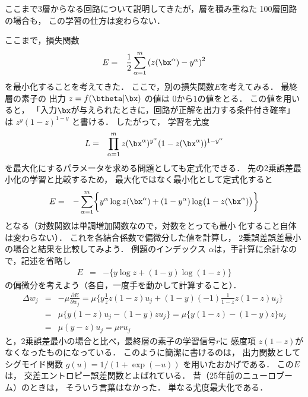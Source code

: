 \documentclass[a4paper,11pt]{jarticle}
\begin{document}
ここまで3層からなる回路について説明してきたが，層を積み重ねた
100層回路の場合も，
この学習の仕方は変わらない．


ここまで，損失関数
\begin{eqnarray}
E & = & \frac{1}{2} 
\sum_{\alpha=1}^{m} 
\left ( z(\bx^\alpha) - y^\alpha \right )^2
\end{eqnarray}
を最小化することを考えてきた．
ここで，別の損失関数$E$を考えてみる．
最終層の素子の
出力 $ z = f(\btheta | \bx)$ の値は
$0$から$1$の値をとる．
この値を用いると，
「入力$\bx$が与えられたときに，回路が正解を出力する条件付き確率」
は
$ z^y (1-z)^{1-y}$
 と書ける．
 したがって，
 学習を尤度
\begin{eqnarray}
 L & = &
\prod_{\alpha=1}^{m} 
z(\bx^\alpha)^{y^\alpha} (1-z(\bx^\alpha))^{1-{y^{\alpha}}}
\end{eqnarray}
を最大化にするパラメータを求める問題としても定式化できる．
先の2乗誤差最小化の学習と比較するため，
最大化ではなく最小化として定式化すると
\begin{eqnarray}
 E & = &
- \sum_{\alpha=1}^{m} 
\biggl \{ y^\alpha \log z(\bx^\alpha) + (1-y^\alpha) \log \bigl ( 1-z(\bx^\alpha)
       \bigr )  \biggr \}
\end{eqnarray}
となる（対数関数は単調増加関数なので，対数をとっても最小
化すること自体は変わらない）．
       これを各結合係数で偏微分した値を計算し，
       2乗誤差誤差最小の場合と結果を比較してみよう．
       例題のインデックス $\alpha$は，手計算に余計なので，記述を省略し
\begin{eqnarray}
 E & = & - \biggl \{ 
    y \log z + (1-y) \log ( 1-z)
\biggl \}
\end{eqnarray}
の偏微分を考えよう（各自，一度手を動かして計算すること）．
\begin{eqnarray}
\Delta w_{j} 
& = & - \mu \frac{\partial E}{\partial w_{j}} 
 =  \mu
 \biggl \{
y \frac{1}{z} z(1-z) u_j
+ (1-y)
(-1) \frac{1}{1-z} z(1-z) u_j
\biggl \} \\
 & = &
 \mu
 \biggl \{
y (1-z) u_j
- (1-y)
 z u_j
\biggl \} 
=  \mu
 \biggl \{
y (1-z) 
- (1-y)
 z 
\biggl \} u_j
\\
 & = &
 \mu
(y-z) 
u_j = 
 \mu
 r
u_j
\end{eqnarray}
と，2乗誤差最小の場合と比べ，最終層の素子の学習信号$r$に
感度項 $ z(1-z)$がなくなったものになっている．
このように簡潔に書けるのは，
出力関数として
シグモイド関数 $ g(u)= 1/(1+\exp(-u))$ を用いたおかげである．
この$E$は，
交差エントロピー誤差関数とよばれている．
昔（25年前のニューロブーム）のときは，
そういう言葉はなかった．
単なる尤度最大化である．
\end{document}
